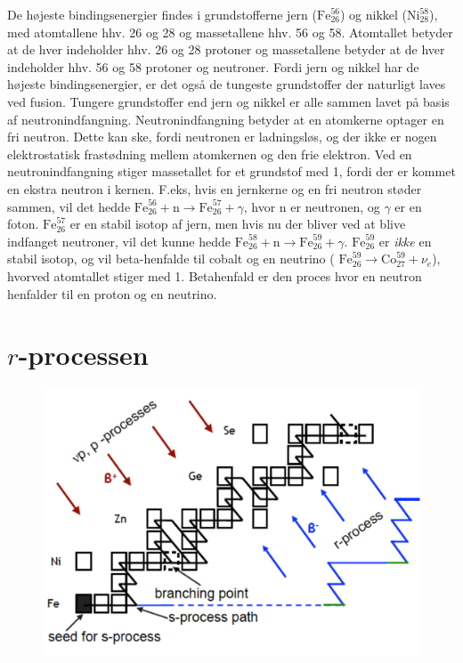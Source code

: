\documentclass[twocolumn]{article}
\begin{document}
De højeste bindingsenergier findes i grundstofferne jern ($\mathrm{Fe}_{26}^{56}$) og nikkel ($\mathrm{Ni}_{28}^{58}$), med atomtallene hhv. 26 og 28 og massetallene hhv. 56 og 58. Atomtallet betyder at de hver indeholder hhv. 26 og 28 protoner og massetallene betyder at de hver indeholder hhv. 56 og 58 protoner og neutroner. Fordi jern og nikkel har de højeste bindingsenergier, er det også de tungeste grundstoffer der naturligt laves ved fusion. Tungere grundstoffer end jern og nikkel er alle sammen lavet på basis af neutronindfangning. Neutronindfangning betyder at en atomkerne optager en fri neutron. Dette kan ske, fordi neutronen er ladningsløs, og der ikke er nogen elektrostatisk frastødning mellem atomkernen og den frie elektron. Ved en neutronindfangning stiger massetallet for et grundstof med 1, fordi der er kommet en ekstra neutron i kernen. F.eks, hvis en jernkerne og en fri neutron støder sammen, vil det hedde $\mathrm{Fe}_{26}^{56} + \mathrm{n} \rightarrow \mathrm{Fe}_{26}^{57} + \gamma$, hvor n er neutronen, og $\gamma$ er en foton. $\mathrm{Fe}_{26}^{57}$ er en stabil isotop af jern, men hvis nu der bliver ved at blive indfanget neutroner, vil det kunne hedde $\mathrm{Fe}_{26}^{58} + \mathrm{n} \rightarrow \mathrm{Fe}_{26}^{59} + \gamma$. $\mathrm{Fe}_{26}^{59}$ er \textit{ikke} en stabil isotop, og vil beta-henfalde til cobalt og en neutrino ( $\mathrm{Fe}_{26}^{59} \rightarrow  \mathrm{Co}_{27}^{59} + \nu_e$), hvorved atomtallet stiger med 1. Betahenfald er den proces hvor en neutron henfalder til en proton og en neutrino.


\section{$r$-processen}\label{rproc}

\begin{figure}
\includegraphics[width=\columnwidth]{r-process2.pdf}
\end{figure}
\end{document}
